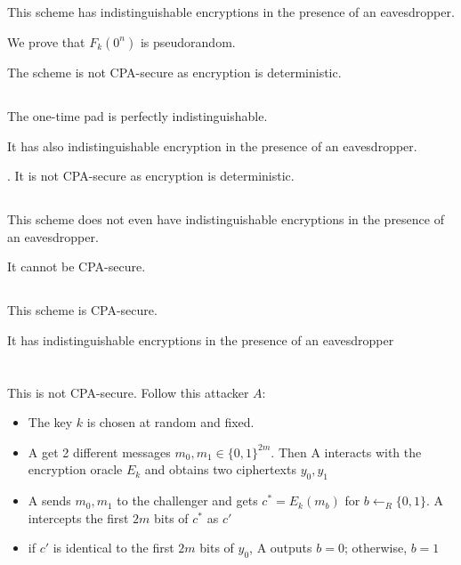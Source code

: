 \documentclass[onecolumn,oneside]{SUSTechHomework}
\begin{document}
    \subsection{}

    This scheme has indistinguishable encryptions in the presence of an
    eavesdropper.

    We prove that $F_k(0^n)$ is pseudorandom.

    The scheme is not CPA-secure as encryption is deterministic.

    \subsection{}

    The one-time pad is perfectly indistinguishable.

    It has also indistinguishable encryption in the presence of an
    eavesdropper.

    . It is not CPA-secure as encryption is deterministic.

    \subsection{}

    This scheme does not even have indistinguishable encryptions in the
    presence of an eavesdropper.

    It cannot be CPA-secure.

    \subsection{}

    This scheme is CPA-secure.

    It has indistinguishable encryptions in the presence of an eavesdropper 

  \section{}

    \subsection{}

    This is not CPA-secure. Follow this attacker $A$:

    \begin{itemize}
      \item The key $k$ is chosen at random and fixed.
      \item A get 2 different messages $m_0,m_1 \in \{0,1\}^{2m}$. Then A interacts with the encryption oracle $E_k$ and obtains two ciphertexts $y_0, y_1$
      \item A sends $m_0,m_1$ to the challenger and gets $c^*=E_k(m_b)$ for $b \leftarrow _R\{0,1\}$. A intercepts the first $2m$ bits of $c^*$ as $c'$
      \item if $c'$ is identical to the first $2m$ bits of $y_0$, A outputs $b=0$; otherwise, $b=1$
    \end{itemize}
\end{document}

